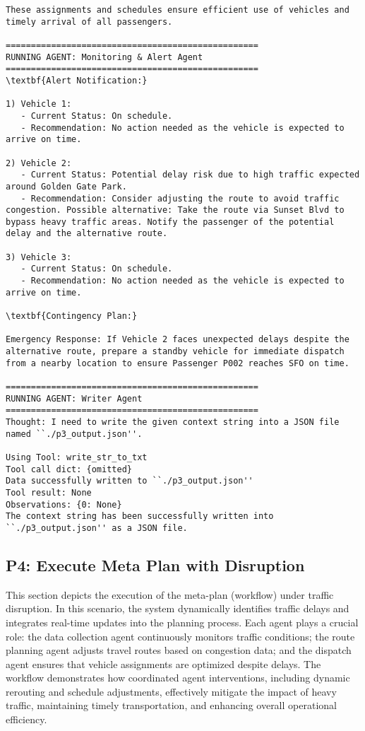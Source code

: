 \begin{lstlisting}[style=JSONStyle, caption=Sample JSON Output from Agentic Workflow, label=lst:data_collectionp3p4]
These assignments and schedules ensure efficient use of vehicles and timely arrival of all passengers.

==================================================
RUNNING AGENT: Monitoring & Alert Agent
==================================================
\textbf{Alert Notification:}

1) Vehicle 1:
   - Current Status: On schedule.
   - Recommendation: No action needed as the vehicle is expected to arrive on time.

2) Vehicle 2:
   - Current Status: Potential delay risk due to high traffic expected around Golden Gate Park.
   - Recommendation: Consider adjusting the route to avoid traffic congestion. Possible alternative: Take the route via Sunset Blvd to bypass heavy traffic areas. Notify the passenger of the potential delay and the alternative route.

3) Vehicle 3:
   - Current Status: On schedule.
   - Recommendation: No action needed as the vehicle is expected to arrive on time.

\textbf{Contingency Plan:}

Emergency Response: If Vehicle 2 faces unexpected delays despite the alternative route, prepare a standby vehicle for immediate dispatch from a nearby location to ensure Passenger P002 reaches SFO on time.

==================================================
RUNNING AGENT: Writer Agent
==================================================
Thought: I need to write the given context string into a JSON file named ``./p3_output.json''.

Using Tool: write_str_to_txt
Tool call dict: {omitted}
Data successfully written to ``./p3_output.json''
Tool result: None
Observations: {0: None}
The context string has been successfully written into ``./p3_output.json'' as a JSON file.

\end{lstlisting}

\subsection{P4: Execute Meta Plan with Disruption}

This section depicts the execution of the meta-plan (workflow) under traffic disruption. In this scenario, the system dynamically identifies traffic delays and integrates real-time updates into the planning process. Each agent plays a crucial role: the data collection agent continuously monitors traffic conditions; the route planning agent adjusts travel routes based on congestion data; and the dispatch agent ensures that vehicle assignments are optimized despite delays. The workflow demonstrates how coordinated agent interventions, including dynamic rerouting and schedule adjustments, effectively mitigate the impact of heavy traffic, maintaining timely transportation, and enhancing overall operational efficiency.

